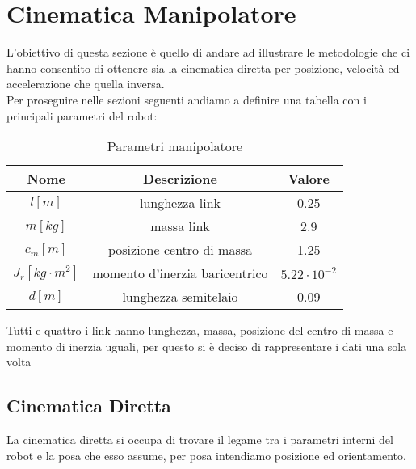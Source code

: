 \section{Cinematica Manipolatore}
L'obiettivo di questa sezione è quello di andare ad illustrare le metodologie che ci hanno consentito di ottenere sia la cinematica diretta per posizione, velocità ed accelerazione che quella inversa.
\\Per proseguire nelle sezioni seguenti andiamo a definire una tabella con i principali parametri del robot:
\begin{table}[h!]
\centering
\begin{tabular}{|c |c |c|} 
 \hline
 Nome & Descrizione  & Valore \\ [0.5ex] 
 \hline\hline
 $l [m]$ & lunghezza link  & 0.25 \\ 
 $m [kg]$ & massa link & 2.9 \\
 $c_m [m]$ & posizione centro di massa & 1.25 \\
 $J_r [kg\cdot m^2]$ & momento d'inerzia baricentrico & $5.22\cdot 10^{-2}$ \\
 $d [m]$ & lunghezza semitelaio & 0.09 \\
 \hline
\end{tabular}
\caption{Parametri manipolatore}
\label{table:1}
\end{table}
Tutti e quattro i link hanno lunghezza, massa, posizione del centro di massa e momento di inerzia uguali, per questo si è deciso di rappresentare i dati una sola volta
\subsection{Cinematica Diretta}
La cinematica diretta si occupa di trovare il legame tra i parametri interni del robot e la posa che esso assume, per posa intendiamo posizione ed orientamento.

